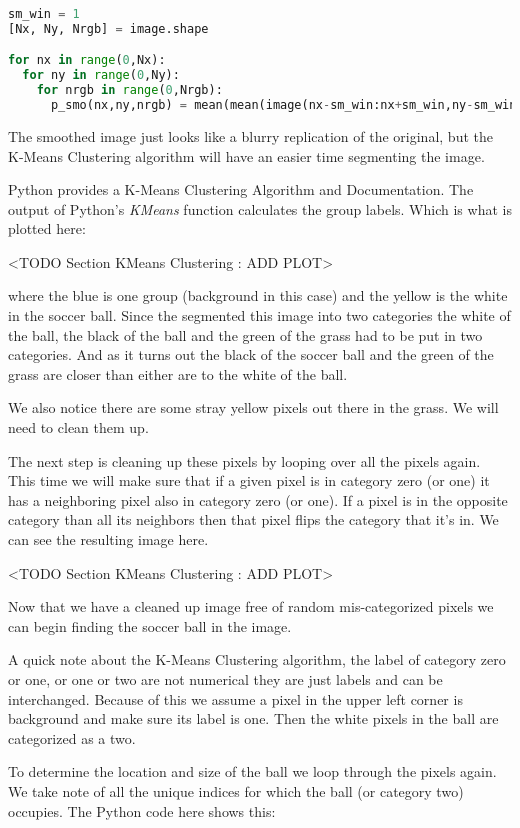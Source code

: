 \begin{lstlisting}[language=Python]
sm_win = 1
[Nx, Ny, Nrgb] = image.shape

for nx in range(0,Nx):
  for ny in range(0,Ny):
    for nrgb in range(0,Nrgb):
      p_smo(nx,ny,nrgb) = mean(mean(image(nx-sm_win:nx+sm_win,ny-sm_win:ny+sm_win,nrgb))
\end{lstlisting}

The smoothed image just looks like a blurry replication of the original, but the K-Means Clustering algorithm will have an easier time segmenting the image.

Python provides a K-Means Clustering Algorithm and Documentation. The output of Python's \emph{KMeans} function calculates the group labels. Which is what is plotted here:

<TODO Section KMeans Clustering : ADD PLOT>


where the blue is one group (background in this case) and the yellow is the white in the soccer ball. Since the segmented this image into two categories the white of the ball, the black of the ball and the green of the grass had to be put in two categories. And as it turns out the black of the soccer ball and the green of the grass are closer than either are to the white of the ball.

We also notice there are some stray yellow pixels out there in the grass. We will need to clean them up.

The next step is cleaning up these pixels by looping over all the pixels again. This time we will make sure that if a given pixel is in category zero (or one) it has a neighboring pixel also in category zero (or one). If a pixel is in the opposite category than all its neighbors then that pixel flips the category that it's in. We can see the resulting image here.


<TODO Section KMeans Clustering : ADD PLOT>


Now that we have a cleaned up image free of random mis-categorized pixels we can begin finding the soccer ball in the image.

A quick note about the K-Means Clustering algorithm, the label of category zero or one, or one or two are not numerical they are just labels and can be interchanged. Because of this we assume a pixel in the upper left corner is background and make sure its label is one. Then the white pixels in the ball are categorized as a two.

To determine the location and size of the ball we loop through the pixels again. We take note of all the unique indices for which the ball (or category two) occupies. The Python code here shows this:

